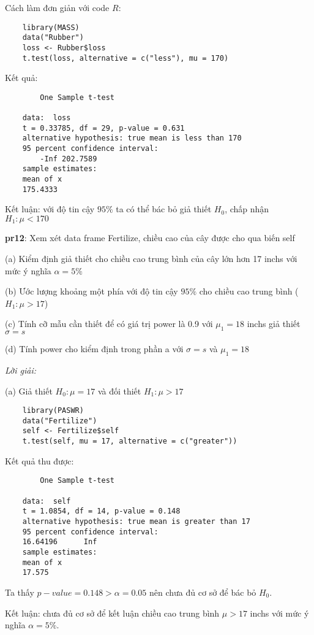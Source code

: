 Cách làm đơn giản với code $R$:
\begin{lstlisting}
    library(MASS)
    data("Rubber")
    loss <- Rubber$loss
    t.test(loss, alternative = c("less"), mu = 170)
\end{lstlisting}
Kết quả:
\begin{lstlisting}
        One Sample t-test

    data:  loss
    t = 0.33785, df = 29, p-value = 0.631
    alternative hypothesis: true mean is less than 170
    95 percent confidence interval:
        -Inf 202.7589
    sample estimates:
    mean of x 
    175.4333 
\end{lstlisting}
Kết luận: với độ tin cậy $95\%$ ta có thể bác bỏ giả thiết $H_0$, chấp nhận $H_1: \mu < 170$

\textbf{pr12}: Xem xét data frame Fertilize, chiều cao của cây được cho qua biến self

(a) Kiểm định giả thiết cho chiều cao trung bình của cây lớn hơn 17 inchs với mức ý nghĩa $\alpha = 5\%$

(b) Ước lượng khoảng một phía với độ tin cậy $95\%$ cho chiều cao trung bình ($H_1: \mu > 17$)

(c) Tính cỡ mẫu cần thiết để có giá trị power là 0.9 với $\mu_1 = 18$ inchs giả thiết $\sigma = s$

(d) Tính power cho kiểm định trong phần a với $\sigma = s$ và $\mu_1 = 18$

\textit{Lời giải:}

(a) Giả thiết $H_0: \mu = 17$ và đối thiết $H_1: \mu > 17$

\begin{lstlisting}
    library(PASWR)
    data("Fertilize")
    self <- Fertilize$self
    t.test(self, mu = 17, alternative = c("greater"))
\end{lstlisting}

Kết quả thu được:

\begin{lstlisting}
        One Sample t-test

    data:  self
    t = 1.0854, df = 14, p-value = 0.148
    alternative hypothesis: true mean is greater than 17
    95 percent confidence interval:
    16.64196      Inf
    sample estimates:
    mean of x 
    17.575 
\end{lstlisting}
Ta thấy $p-value = 0.148 > \alpha = 0.05$ nên chưa đủ cơ sở để bác bỏ $H_0$.

Kết luận: chưa đủ cơ sở để kết luận chiều cao trung bình $\mu > 17$ inchs với 
mức ý nghĩa $\alpha = 5\%$.

